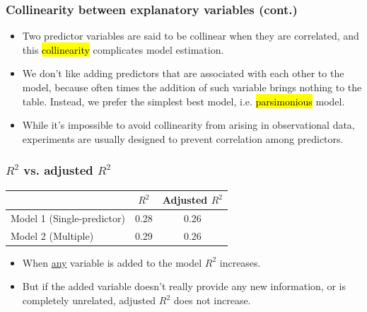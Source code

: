 
\begin{frame}
\frametitle{Collinearity between explanatory variables (cont.)}

\begin{itemize}

\item Two predictor variables are said to be collinear when they are correlated, and this \hl{collinearity} complicates model estimation. \\

\pause

\item We don't like adding predictors that are associated with each other to the model, because often times the addition of such variable brings nothing to the table. Instead, we prefer the simplest best model, i.e. \hl{parsimonious} model.

\pause

\item While it's impossible to avoid collinearity from arising in observational data, experiments are usually designed to prevent correlation among predictors.

\end{itemize}

\end{frame}

%
%
%
%
%
%
%

\begin{frame}[fragile]
\frametitle{$R^2$ vs. adjusted $R^2$}

\renewcommand\arraystretch{1.25}
\begin{center}
\begin{tabular}{l | c  c}
			& $R^2$	& Adjusted $R^2$ \\
\hline
Model 1 (Single-predictor)	& 0.28	& 0.26 \\
Model 2 (Multiple)			& 0.29	& 0.26 	
\end{tabular}
\end{center}

\pause

\begin{itemize}

\item When \underline{any} variable is added to the model $R^2$ increases.

\pause

\item But if the added variable doesn't really provide any new information, or is completely unrelated, adjusted $R^2$ does not increase.

\end{itemize}



\end{frame}

